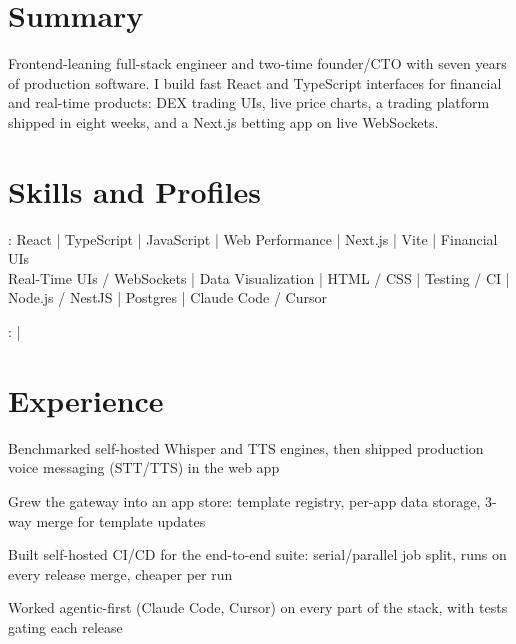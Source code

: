 \documentclass[print]{jack-resume}
\begin{document}
\pagecolor{darkmodeBackground}


\begin{minipage}[t][1cm][t]{.03\textwidth}
    \hfill
\end{minipage}

\section{Summary}
Frontend-leaning full-stack engineer and two-time founder/CTO with seven years of production software. I build fast React and TypeScript interfaces for financial and real-time products: DEX trading UIs, live price charts, a trading platform shipped in eight weeks, and a Next.js betting app on live WebSockets.
\sectionsep

\section{Skills and Profiles}
:
React \hfill | \hfill
TypeScript \hfill | \hfill
JavaScript \hfill | \hfill
Web Performance \hfill | \hfill
Next.js \hfill | \hfill
Vite \hfill | \hfill
Financial UIs \\
\hspace{1.0cm} Real-Time UIs / WebSockets \hfill | \hfill
Data Visualization \hfill | \hfill
HTML / CSS \hfill | \hfill
Testing / CI \hfill | \hfill
Node.js / NestJS \hfill | \hfill
Postgres \hfill | \hfill
Claude Code / Cursor \\

\raggedright{
    :
      \href{https://www.linkedin.com/in/jack-sturtevant/}{ \ExternalLink} |
     \href{https://github.com/jacksturt}{ \ExternalLink}}

\section{Experience}

\begin{tightemize}
    \item Benchmarked self-hosted Whisper and TTS engines, then shipped production voice messaging (STT/TTS) in the web app
    \item Grew the gateway into an app store: template registry, per-app data storage, 3-way merge for template updates
    \item Built self-hosted CI/CD for the end-to-end suite: serial/parallel job split, runs on every release merge, cheaper per run
    \item Worked agentic-first (Claude Code, Cursor) on every part of the stack, with tests gating each release
\end{tightemize}
\sectionsep
\end{document}

